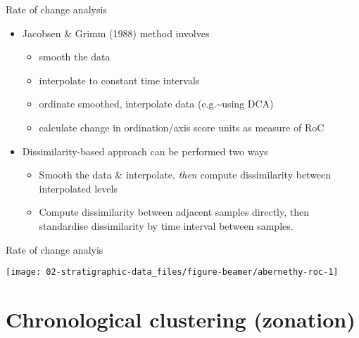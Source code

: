 \documentclass[10pt,ignorenonframetext,compress, aspectratio=169]{beamer}
\providecommand{\tightlist}{%
  \setlength{\itemsep}{0pt}\setlength{\parskip}{0pt}}
\begin{document}
\begin{frame}{Rate of change analysis}

\begin{itemize}
\tightlist
\item
  Jacobsen \& Grimm (1988) method involves

  \begin{itemize}
  \tightlist
  \item
    smooth the data
  \item
    interpolate to constant time intervals
  \item
    ordinate smoothed, interpolate data (e.g.\textasciitilde{}using DCA)
  \item
    calculate change in ordination/axis score units as measure of RoC
  \end{itemize}
\item
  Dissimilarity-based approach can be performed two ways

  \begin{itemize}
  \tightlist
  \item
    Smooth the data \& interpolate, \emph{then} compute dissimilarity
    between interpolated levels
  \item
    Compute dissimilarity between adjacent samples directly, then
    standardise dissimilarity by time interval between samples.
  \end{itemize}
\end{itemize}

\end{frame}

\begin{frame}{Rate of change analyis}

\begin{center}\texttt{[image: 02-stratigraphic-data\_files/figure-beamer/abernethy-roc-1]} \end{center}

\end{frame}

\section{Chronological clustering
(zonation)}\label{chronological-clustering-zonation}
\end{document}
